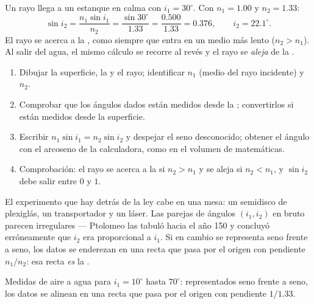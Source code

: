 \begin{example}\label{ex:g10:refraction:airwater}
Un rayo llega a un estanque en calma con $i_1 = 30^\circ$. Con
$n_1 = 1.00$ y $n_2 = 1.33$:
\[
\sin i_2 = \frac{n_1 \sin i_1}{n_2} = \frac{\sin 30^\circ}{1.33}
= \frac{0.500}{1.33} = 0.376,
\qquad
i_2 = 22.1^\circ .
\]
El rayo se acerca a la , como siempre que entra en un medio más
lento ($n_2 > n_1$). Al salir del agua, el mismo cálculo se recorre al
revés y el rayo se \emph{aleja} de la .
\end{example}

\begin{method}\label{met:g10:refraction:method}
\begin{enumerate}
  \item Dibujar la superficie, la  y el rayo; identificar $n_1$
        (medio del rayo incidente) y $n_2$.
  \item Comprobar que los ángulos dados están medidos desde la ;
        convertirlos si están medidos desde la superficie.
  \item Escribir $n_1 \sin i_1 = n_2 \sin i_2$ y despejar el seno
        desconocido; obtener el ángulo con el arcoseno de la
        calculadora, como en el volumen de matemáticas.
  \item Comprobación: el rayo se acerca a la  si $n_2 > n_1$ y se
        aleja si $n_2 < n_1$, y $\sin i_2$ debe salir entre $0$ y $1$.
\end{enumerate}
\end{method}

El experimento que hay detrás de la ley cabe en una mesa: un semidisco
de plexiglás, un transportador y un láser. Las parejas de ángulos
$(i_1, i_2)$ en bruto parecen irregulares --- Ptolomeo las tabuló hacia
el año 150 y concluyó erróneamente que $i_2$ era proporcional a $i_1$.
Si en cambio se representa seno frente a seno, los datos se enderezan en
una recta que pasa por el origen con pendiente $n_1/n_2$: esa recta
\emph{es} la .

\begin{omfigure}

{\small Medidas de aire a agua para $i_1 = 10^\circ$ hasta $70^\circ$:
representados seno frente a seno, los datos se alinean en una recta que
pasa por el origen con pendiente $1/1.33$.}
\end{omfigure}

